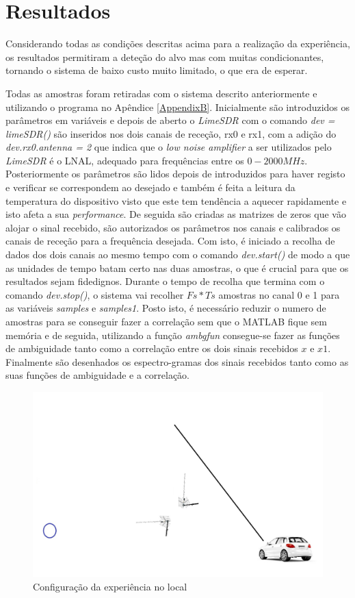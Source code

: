 \section{Resultados}
Considerando todas as condições descritas acima para a realização da experiência, os resultados permitiram a deteção do alvo mas com muitas condicionantes, tornando o sistema de baixo custo muito limitado, o que era de esperar.\par  
Todas as amostras foram retiradas com o sistema descrito anteriormente e utilizando o programa no Apêndice \ref{AppendixB}. Inicialmente são introduzidos os parâmetros em variáveis e depois de aberto o \textit{LimeSDR} com o comando \textit{dev = limeSDR()} são inseridos nos dois canais de receção, rx0 e rx1, com a adição do \textit{dev.rx0.antenna = 2} que indica que o \textit{low noise amplifier} a ser utilizados pelo \textit{LimeSDR} é o LNAL, adequado para frequências entre os $0 - 2000 MHz$. Posteriormente os parâmetros são lidos depois de introduzidos para haver registo e verificar se correspondem ao desejado e também é feita a leitura da temperatura do dispositivo visto que este tem tendência a aquecer rapidamente e isto afeta a sua \textit{performance}. De seguida são criadas as matrizes de zeros que vão alojar o sinal recebido, são autorizados os parâmetros nos canais e calibrados os canais de receção para a frequência desejada. Com isto, é iniciado a recolha de dados dos dois canais ao mesmo tempo com o comando \textit{dev.start()} de modo a que as unidades de tempo batam certo nas duas amostras, o que é crucial para que os resultados sejam fidedignos. Durante o tempo de recolha que termina com o comando \textit{dev.stop()}, o sistema vai recolher $Fs*Ts$ amostras no canal 0 e 1 para as variáveis \textit{samples} e \textit{samples1}. Posto isto, é necessário reduzir o numero de amostras para se conseguir fazer a correlação sem que o MATLAB fique sem memória e de seguida, utilizando a função \textit{ambgfun} consegue-se fazer as funções de ambiguidade tanto como a correlação entre os dois sinais recebidos $x$ e $x1$. Finalmente são desenhados os espectro-gramas  dos sinais recebidos tanto como as suas funções de ambiguidade e a correlação.

\begin{figure}[h]
\centering
\includegraphics[scale=0.3]{chapters/ch5/assets/geoexp}
\caption[Configuração da experiência]{Configuração da experiência no local}
\label{fig:geoexp}
\end{figure}

